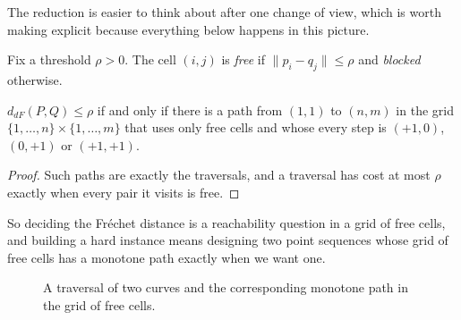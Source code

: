 The reduction is easier to think about after one change of view, which is
worth making explicit because everything below happens in this picture.

\begin{definition}\label{def:free-cell}
Fix a threshold $\rho > 0$. The cell $(i,j)$ is \emph{free} if
$\lVert p_i - q_j\rVert \le \rho$ and \emph{blocked} otherwise.
\end{definition}

\begin{lemma}\label{lem:frechet-reachability}
$d_{dF}(P,Q) \le \rho$ if and only if there is a path from $(1,1)$ to $(n,m)$
in the grid $\{1,\ldots,n\} \times \{1,\ldots,m\}$ that uses only free cells
and whose every step is $(+1,0)$, $(0,+1)$ or $(+1,+1)$.
\end{lemma}

\begin{proof}
Such paths are exactly the traversals, and a traversal has cost at most $\rho$
exactly when every pair it visits is free.
\end{proof}

So deciding the Fr\'echet distance is a reachability question in a grid of
free cells, and building a hard instance means designing two point sequences
whose grid of free cells has a monotone path exactly when we want one.

\begin{figure}[ht]
\centering
{}
\caption{A traversal of two curves and the corresponding monotone path in the
grid of free cells.}
\label{fig:frechet}
\end{figure}

